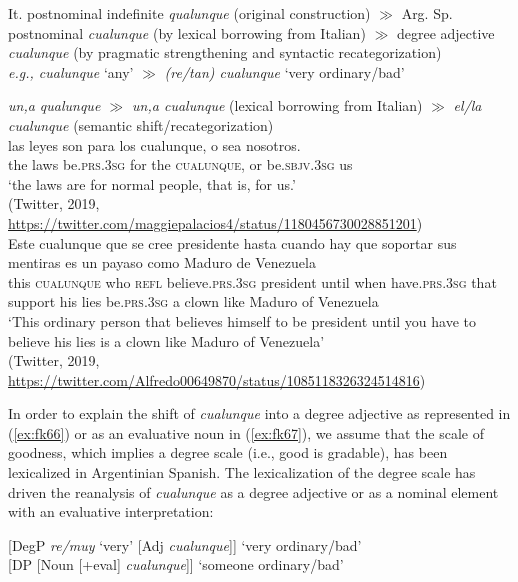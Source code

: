 \documentclass[output=paper,colorlinks,citecolor=brown]{langscibook}
\begin{document}
\ea \label{ex:fk66}
    It. postnominal indefinite \textit{qualunque} (original construction) $\gg$ Arg. Sp. postnominal \textit{cualunque} (by lexical borrowing from Italian) $\gg$ degree adjective \textit{cualunque} (by pragmatic strengthening and syntactic recategorization)\\
    \textit{e.g., cualunque} ‘any’ $\gg$ \textit{(re/tan) cualunque} ‘very ordinary/bad’
    
    \ex \label{ex:fk67}
    \textit{un,a qualunque $\gg$ un,a cualunque} (lexical borrowing from Italian) $\gg$ \textit{el/la cualunque} (semantic shift/recategorization)\\
    \ea \gll las leyes son para los cualunque, o sea nosotros.\\
    the laws be.\textsc{prs.3sg} for the \textsc{cualunque}, or be.\textsc{sbjv.3sg} us\\
       \glt  ‘the laws are for normal people, that is, for us.’\\
        (Twitter, 2019, \url{https://twitter.com/maggiepalacios4/status/1180456730028851201})\\
 \ex \gll Este cualunque que se cree presidente hasta cuando hay que soportar sus mentiras es un payaso como Maduro de Venezuela\\
    this \textsc{cualunque} who \textsc{refl} believe.\textsc{prs.3sg} president until when have.\textsc{prs.3sg} that support his lies be.\textsc{prs.3sg} a clown like Maduro of Venezuela\\
       \glt ‘This ordinary person that believes himself to be president until you have to believe his lies is a clown like Maduro of Venezuela’\\
        (Twitter, 2019, \url{https://twitter.com/Alfredo00649870/status/1085118326324514816})\\
    \z
\z

In order to explain the shift of \textit{cualunque} into a degree adjective as represented in (\ref{ex:fk66}) or as an evaluative noun in (\ref{ex:fk67}), we assume that the scale of goodness, which implies a degree scale (i.e., good is gradable), has been lexicalized in Argentinian Spanish. The lexicalization of the degree scale has driven the reanalysis of \textit{cualunque} as a degree adjective or as a nominal element with an evaluative interpretation:

\ea \label{ex:fk68}
    [DegP \textit{re/muy} ‘very’ [Adj \textit{cualunque}]] ‘very ordinary/bad’\\
    \ex \label{ex:fk69}
    [DP [Noun [+eval] \textit{cualunque}]] ‘someone ordinary/bad’\\
\z
\end{document}
